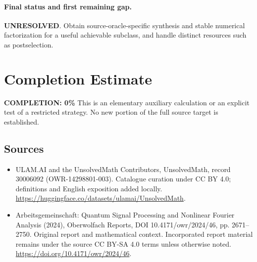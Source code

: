\documentclass[11pt]{article}
\begin{document}
\paragraph{Final status and first remaining gap.}
\textbf{UNRESOLVED}. Obtain source-oracle-specific synthesis and stable numerical factorization for a useful achievable subclass, and handle distinct resources such as postselection.

\section{Completion Estimate}
\noindent\textbf{COMPLETION: 0\%}
This is an elementary auxiliary calculation or an explicit test of a restricted strategy. No new portion of the full source target is established.

\subsection{Sources}
\begin{itemize}
\item[\hypertarget{source:30006092:1}{S1}] ULAM.AI and the UnsolvedMath Contributors, UnsolvedMath, record 30006092 (OWR-14298801-003). Catalogue curation under CC BY 4.0; definitions and English exposition added locally.
\url{https://huggingface.co/datasets/ulamai/UnsolvedMath}.
\item[\hypertarget{source:30006092:2}{S2}] Arbeitsgemeinschaft: Quantum Signal Processing and Nonlinear Fourier Analysis (2024), Oberwolfach Reports, DOI 10.4171/owr/2024/46, pp. 2671--2750. Original report and mathematical context. Incorporated report material remains under the source CC BY-SA 4.0 terms unless otherwise noted.
\url{https://doi.org/10.4171/owr/2024/46}.
\end{itemize}
\label{end:30006092}
\end{document}
